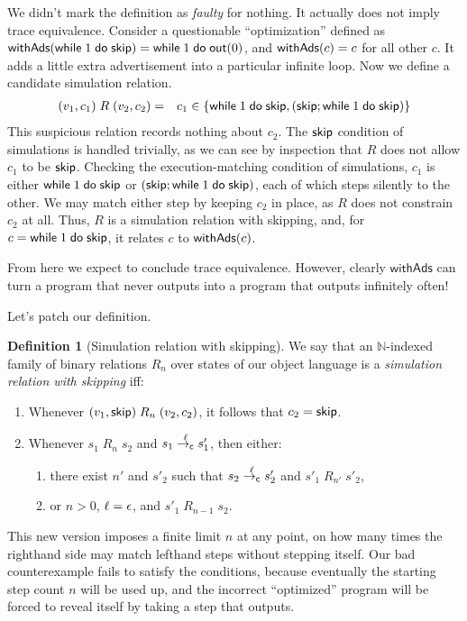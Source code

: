 \documentclass{amsbook}
\theoremstyle{definition}
\newtheorem{definition}[theorem]{Definition}
\theoremstyle{remark}
\numberwithin{section}{chapter}
\numberwithin{equation}{chapter}
\begin{document}
We didn't mark the definition as \emph{faulty} for nothing.
It actually does not imply trace equivalence.
Consider a questionable ``optimization'' defined as $\mathsf{withAds}(\mathsf{while} \; 1 \; \mathsf{do} \; \mathsf{skip}) = \mathsf{while} \; 1 \; \mathsf{do} \; \mathsf{out}(0)$, and $\mathsf{withAds}(c) = c$ for all other $c$.
It adds a little extra advertisement into a particular infinite loop.
Now we define a candidate simulation relation.
\begin{eqnarray*}
  (v_1, c_1) \; R \; (v_2, c_2) &=& c_1 \in \{\mathsf{while} \; 1 \; \mathsf{do} \; \mathsf{skip}, (\mathsf{skip}; \mathsf{while} \; 1 \; \mathsf{do} \; \mathsf{skip})\}
\end{eqnarray*}
This suspicious relation records nothing about $c_2$.
The $\mathsf{skip}$ condition of simulations is handled trivially, as we can see by inspection that $R$ does not allow $c_1$ to be $\mathsf{skip}$.
Checking the execution-matching condition of simulations, $c_1$ is either $\mathsf{while} \; 1 \; \mathsf{do} \; \mathsf{skip}$ or $(\mathsf{skip}; \mathsf{while} \; 1 \; \mathsf{do} \; \mathsf{skip})$, each of which steps silently to the other.
We may match either step by keeping $c_2$ in place, as $R$ does not constrain $c_2$ at all.
Thus, $R$ is a simulation relation with skipping, and, for $c = \mathsf{while} \; 1 \; \mathsf{do} \; \mathsf{skip}$, it relates $c$ to $\mathsf{withAds}(c)$.

From here we expect to conclude trace equivalence.
However, clearly $\mathsf{withAds}$ can turn a program that never outputs into a program that outputs infinitely often!

Let's patch our definition.

\begin{definition}[Simulation relation with skipping]
  We say that an $\mathbb N$-indexed family of binary relations $R_n$ over states of our object language is a \emph{simulation relation with skipping} iff:
  \begin{enumerate}
    \item Whenever $(v_1, \mathsf{skip}) \; R_n \; (v_2, c_2)$, it follows that $c_2 = \mathsf{skip}$.
    \item Whenever $s_1 \; R_n \; s_2$ and $s_1 \stackrel{\ell}{\to_\mathsf{c}} s'_1$, then either:
      \begin{enumerate}
        \item there exist $n'$ and $s'_2$ such that $s_2 \stackrel{\ell}{\to_\mathsf{c}} s'_2$ and $s'_1 \; R_{n'} \; s'_2$,
        \item or $n > 0$, $\ell = \epsilon$, and $s'_1 \; R_{n-1} \; s_2$.
      \end{enumerate}
  \end{enumerate}
\end{definition}

This new version imposes a finite limit $n$ at any point, on how many times the righthand side may match lefthand steps without stepping itself.
Our bad counterexample fails to satisfy the conditions, because eventually the starting step count $n$ will be used up, and the incorrect ``optimized'' program will be forced to reveal itself by taking a step that outputs.
\end{document}
